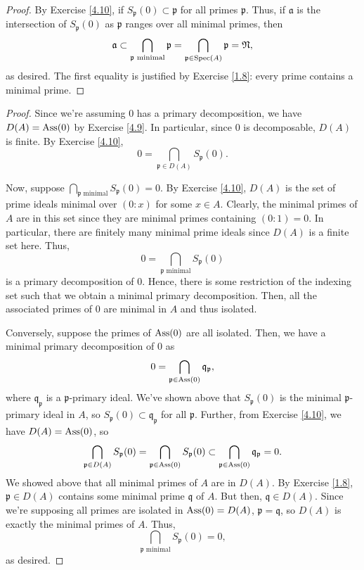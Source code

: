 \begin{proof}
By Exercise \ref{4.10}, if $S_\mathfrak{p}(0) \subset \mathfrak{p}$ for all primes $\mathfrak{p}$. Thus, if $\mathfrak{a}$ is the intersection of $S_\mathfrak{p}(0)$ as $\mathfrak{p}$
ranges over all minimal primes, then
$$\mathfrak{a} \subset \bigcap_{\mathfrak{p} \text{ minimal}}\mathfrak{p} = \bigcap_{\mathfrak{p} \in \operatorname{Spec}(A)}\mathfrak{p} = \mathfrak{N},$$
as desired. The first equality is justified by Exercise \ref{1.8}: every prime contains a minimal prime.
\end{proof}

\begin{proof}
Since we're assuming $0$ has a primary decomposition, we have $D(A) = \operatorname{Ass}(0)$ by Exercise \ref{4.9}. In particular, since $0$ is decomposable, $D(A)$ is finite. By Exercise \ref{4.10}, 
$$0 = \bigcap_{\mathfrak{p} \in D(A)}S_\mathfrak{p}(0).$$

Now, suppose $\bigcap_{\mathfrak{p} \text{ minimal}} S_\mathfrak{p}(0) = 0$. By Exercise \ref{4.10}, $D(A)$ is the set of prime ideals minimal over $(0:x)$ for some $x \in A$. Clearly, the
minimal primes of $A$ are in this set since they are minimal primes containing $(0:1) = 0$. In particular, there are finitely many minimal prime ideals since $D(A)$ is a finite set here. Thus,
$$0 = \bigcap_{\mathfrak{p} \text{ minimal}} S_\mathfrak{p}(0)$$
is a primary decomposition of $0$. Hence, there is some restriction of the indexing set such that we obtain a minimal primary decomposition. Then, all the associated primes of $0$ are minimal 
in $A$ and thus isolated.

Conversely, suppose the primes of $\operatorname{Ass}(0)$ are all isolated. Then, we have a minimal primary decomposition of $0$ as 
$$0 = \bigcap_{\mathfrak{p} \in \operatorname{Ass}(0)}\mathfrak{q}_{\mathfrak{p}},$$
where $\mathfrak{q}_{\mathfrak{p}}$ is a $\mathfrak{p}$-primary ideal. We've shown above that $S_{\mathfrak{p}}(0)$ is the minimal $\mathfrak{p}$-primary ideal in $A$, so
$S_{\mathfrak{p}}(0) \subset \mathfrak{q}_{\mathfrak{p}}$ for all $\mathfrak{p}$. Further, from Exercise \ref{4.10}, we have $D(A) = \operatorname{Ass}(0)$, so
$$\bigcap_{\mathfrak{p} \in D(A)}S_{\mathfrak{p}}(0) = \bigcap_{\mathfrak{p} \in \operatorname{Ass}(0)}S_{\mathfrak{p}}(0) \subset \bigcap_{\mathfrak{p} \in \operatorname{Ass}(0)}\mathfrak{q}_{\mathfrak{p}} = 0.$$
We showed above that all minimal primes of $A$ are in $D(A)$. By Exercise \ref{1.8}, $\mathfrak{p} \in D(A)$ contains some minimal prime $\mathfrak{q}$ of $A$. But then, $\mathfrak{q} \in D(A)$. 
Since we're supposing all primes are isolated in $\operatorname{Ass}(0) = D(A)$, $\mathfrak{p} = \mathfrak{q}$, so $D(A)$ is exactly the minimal primes of $A$. Thus,
$$\bigcap_{\mathfrak{p} \text{ minimal}}S_{\mathfrak{p}}(0) = 0,$$
as desired.
\end{proof}

